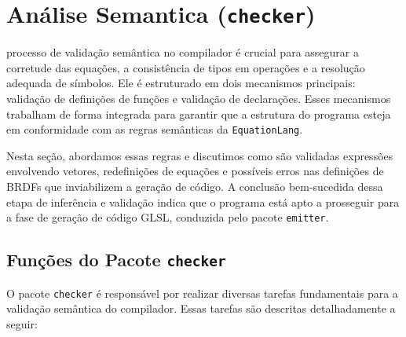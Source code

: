 
\section{Análise Semantica (\texttt{checker})} \label{section-checker}
processo de validação semântica no compilador é crucial para assegurar a corretude das equações, a consistência de tipos em operações e a resolução adequada de símbolos. Ele é estruturado em dois mecanismos principais: validação de definições de funções e validação de declarações. Esses mecanismos trabalham de forma integrada para garantir que a estrutura do programa esteja em conformidade com as regras semânticas da \texttt{EquationLang}.

Nesta seção, abordamos essas regras e discutimos como são validadas expressões envolvendo vetores, redefinições de equações e possíveis erros nas definições de BRDFs que inviabilizem a geração de código. A conclusão bem-sucedida dessa etapa de inferência e validação indica que o programa está apto a prosseguir para a fase de geração de código GLSL, conduzida pelo pacote \texttt{emitter}.


\subsection{Funções do Pacote \texttt{checker}}

O pacote \texttt{checker} é responsável por realizar diversas tarefas fundamentais para a validação semântica do compilador. Essas tarefas são descritas detalhadamente a seguir:

